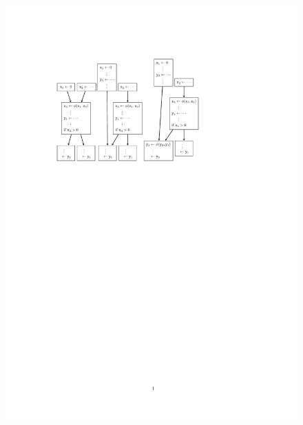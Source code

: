 \begin{figure}[htbp]
\begin{center}
{			\includegraphics{jump_thread_broken.pdf}
		}
		\hfill
\end{center}
\end{figure}
